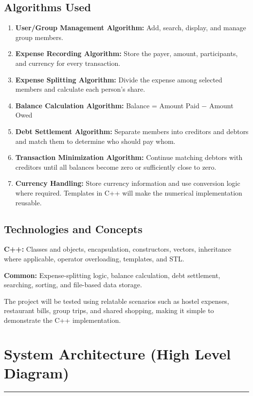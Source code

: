 \documentclass[11pt,a4paper]{article}
\begin{document}
\subsection*{Algorithms Used}

\begin{enumerate}[leftmargin=1.8em]
  \item \textbf{User/Group Management Algorithm:} Add, search, display, and manage group members.
  \item \textbf{Expense Recording Algorithm:} Store the payer, amount, participants, and currency for every transaction.
  \item \textbf{Expense Splitting Algorithm:} Divide the expense among selected members and calculate each person's share.
  \item \textbf{Balance Calculation Algorithm:} Balance = Amount Paid $-$ Amount Owed
  \item \textbf{Debt Settlement Algorithm:} Separate members into creditors and debtors and match them to determine who should pay whom.
  \item \textbf{Transaction Minimization Algorithm:} Continue matching debtors with creditors until all balances become zero or sufficiently close to zero.
  \item \textbf{Currency Handling:} Store currency information and use conversion logic where required. Templates in C++ will make the numerical implementation reusable.
\end{enumerate}

\subsection*{Technologies and Concepts}

\textbf{C++:} Classes and objects, encapsulation, constructors, vectors, inheritance where applicable, operator overloading, templates, and STL.

\textbf{Common:} Expense-splitting logic, balance calculation, debt settlement, searching, sorting, and file-based data storage.

The project will be tested using relatable scenarios such as hostel expenses, restaurant bills, group trips, and shared shopping, making it simple to demonstrate the C++ implementation.

\clearpage
\section*{System Architecture (High Level Diagram)}
\noindent\rule{\linewidth}{0.8pt}
\end{document}
